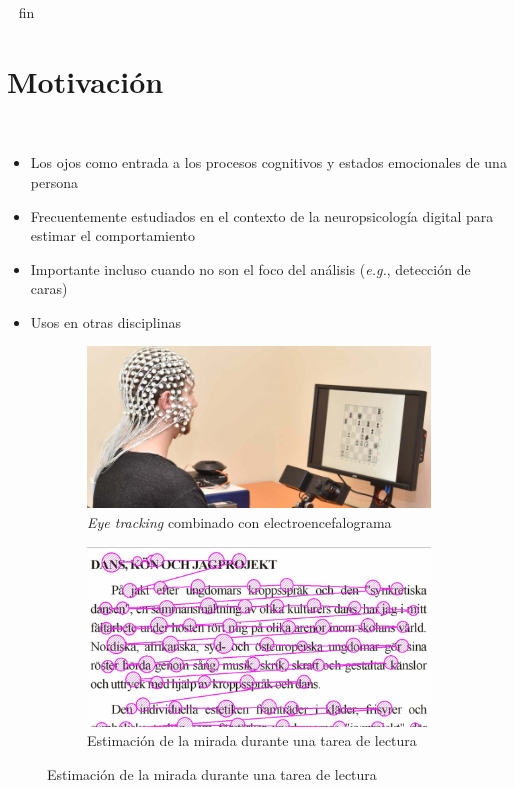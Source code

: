 \documentclass[aspectratio=169]{beamer}
\begin{document}
\begin{frame}{~}
  fin
\end{frame}

\section{Motivación}

\begin{frame}{~}

  \begin{itemize}
      \item Los ojos como entrada a los procesos cognitivos y estados
        emocionales de una persona
      \item Frecuentemente estudiados en el contexto de la neuropsicología
        digital para estimar el comportamiento
      \item Importante incluso cuando no son el foco del análisis
        (\textit{e.g.}, detección de caras)
      \item Usos en otras disciplinas
  \end{itemize}

  \begin{figure}
    \begin{subfigure}{0.49\textwidth}
      \centering
      \includegraphics[width=\linewidth]{img/eye-link-eeg.jpg}
      \caption{\textit{Eye tracking} combinado con electroencefalograma}
    \end{subfigure}
    \begin{subfigure}{0.49\textwidth}
      \centering
      \includegraphics[width=\linewidth]{img/reading-fixations-saccades.jpg}
      \caption{Estimación de la mirada durante una tarea de lectura}
    \end{subfigure}
  \end{figure}


\end{frame}
\end{document}
